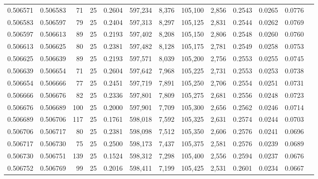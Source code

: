 \begin{tabular}{rrrrrrrrrrrrr}
0.506571 & 0.506583 &  71 &  25 &                                     0.2604 & 597,234 &   8,376 & 105,100 &   2,856 & 0.2543 & 0.0265 & 0.0776 \\
0.506583 & 0.506597 &  79 &  25 &                                     0.2404 & 597,313 &   8,297 & 105,125 &   2,831 & 0.2544 & 0.0262 & 0.0769 \\
0.506597 & 0.506613 &  89 &  25 &                                     0.2193 & 597,402 &   8,208 & 105,150 &   2,806 & 0.2548 & 0.0260 & 0.0760 \\
0.506613 & 0.506625 &  80 &  25 &                                     0.2381 & 597,482 &   8,128 & 105,175 &   2,781 & 0.2549 & 0.0258 & 0.0753 \\
0.506625 & 0.506639 &  89 &  25 &                                     0.2193 & 597,571 &   8,039 & 105,200 &   2,756 & 0.2553 & 0.0255 & 0.0745 \\
0.506639 & 0.506654 &  71 &  25 &                                     0.2604 & 597,642 &   7,968 & 105,225 &   2,731 & 0.2553 & 0.0253 & 0.0738 \\
0.506654 & 0.506666 &  77 &  25 &                                     0.2451 & 597,719 &   7,891 & 105,250 &   2,706 & 0.2554 & 0.0251 & 0.0731 \\
0.506666 & 0.506676 &  82 &  25 &                                     0.2336 & 597,801 &   7,809 & 105,275 &   2,681 & 0.2556 & 0.0248 & 0.0723 \\
0.506676 & 0.506689 & 100 &  25 &                                     0.2000 & 597,901 &   7,709 & 105,300 &   2,656 & 0.2562 & 0.0246 & 0.0714 \\
0.506689 & 0.506706 & 117 &  25 &                                     0.1761 & 598,018 &   7,592 & 105,325 &   2,631 & 0.2574 & 0.0244 & 0.0703 \\
0.506706 & 0.506717 &  80 &  25 &                                     0.2381 & 598,098 &   7,512 & 105,350 &   2,606 & 0.2576 & 0.0241 & 0.0696 \\
0.506717 & 0.506730 &  75 &  25 &                                     0.2500 & 598,173 &   7,437 & 105,375 &   2,581 & 0.2576 & 0.0239 & 0.0689 \\
0.506730 & 0.506751 & 139 &  25 &                                     0.1524 & 598,312 &   7,298 & 105,400 &   2,556 & 0.2594 & 0.0237 & 0.0676 \\
0.506752 & 0.506769 &  99 &  25 &                                     0.2016 & 598,411 &   7,199 & 105,425 &   2,531 & 0.2601 & 0.0234 & 0.0667 \\

\end{tabular}

